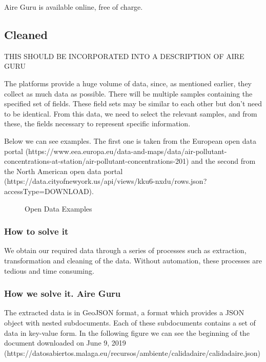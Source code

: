 Aire Guru is available online, free of charge.

\subsection*{Cleaned}

THIS SHOULD BE INCORPORATED INTO A DESCRIPTION OF AIRE GURU

The platforms provide a huge volume of data, since, as mentioned earlier, they collect as much data as possible.
There will be multiple samples containing the specified set of fields. These field sets may be similar to each other but don't need to be identical.
From this data, we need to select the relevant samples, and from these, the fields necessary to represent specific information.

Below we can see examples. The first one is taken from the European open data portal
(https://www.eea.europa.eu/data-and-maps/data/air-pollutant-concentrations-at-station/air-pollutant-concentrations-201) and the second from the North American open data portal
(https://data.cityofnewyork.us/api/views/kku6-nxdu/rows.json?accessType=DOWNLOAD).

\begin{figure}[ht]
    \centering
    \hfill
    \caption{Open Data Examples}
\end{figure}
    
\subsubsection*{How to solve it}

We obtain our required data through a series of processes such as extraction, transformation and
cleaning of the data. Without automation, these processes are tedious and time consuming. 

\subsubsection*{How we solve it. Aire Guru} 

The extracted data is in GeoJSON format, a format which provides a JSON object with nested subdocuments. Each of these
subdocuments contains a set of data in key-value form.
In the following figure we can see the beginning of the document downloaded on June 9, 2019
(https://datosabiertos.malaga.eu/recursos/ambiente/calidadaire/calidadaire.json) \\

